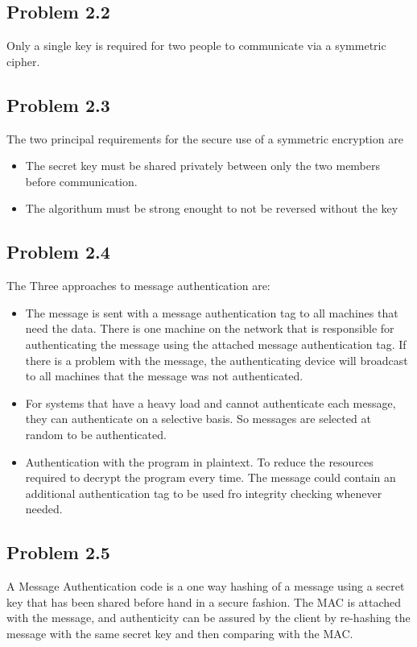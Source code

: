 \documentclass[14pt]{article}
\begin{document}
\subsection{Problem  2.2}
Only a single key is required for two people to communicate via a symmetric cipher.
\subsection{Problem  2.3}
The two principal requirements for the secure use of a symmetric encryption are
\begin{itemize}
\item The secret key must be shared privately between only the two members before communication.
\item The algorithum must be strong enought to not be reversed without the key
\end{itemize}
\subsection{Problem  2.4}
The Three approaches to message authentication are:
\begin{itemize}
\item The message is sent with a message authentication tag to all machines that need the data. There is one machine on the network that is responsible for authenticating the message using the attached message authentication tag. If there is a problem with the message, the authenticating device will broadcast to all machines that the message was not authenticated.
\item For systems that have a heavy load and cannot authenticate each message, they can authenticate on a selective basis. So messages are selected at random to be authenticated. 
\item Authentication with the program in plaintext. To reduce the resources required to decrypt the program every time. The message could contain an additional authentication tag to be used fro integrity checking whenever needed.
\end{itemize}
\subsection{Problem  2.5}
A Message Authentication code is a one way hashing of a message using a secret key that has been shared before hand in a secure fashion. The MAC is attached with the message, and authenticity can be assured by the client by re-hashing the message with the same secret key and then comparing with the MAC. 
\end{document}
